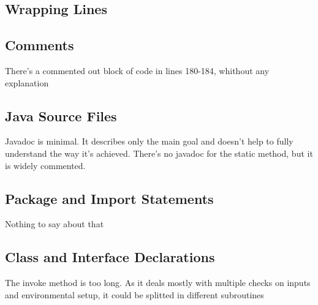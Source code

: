 \documentclass{article}
\begin{document}
\subsection{Wrapping Lines}

\subsection{Comments}
There's a commented out block of code in lines 180-184, whithout any explanation

\subsection{Java Source Files}
Javadoc is minimal. It describes only the main goal and doesn't help to fully understand the way it's achieved. There's no javadoc for the static method, but it is widely commented.

\subsection{Package and Import Statements}
Nothing to say about that

\subsection{Class and Interface Declarations}
The invoke method is too long. As it deals mostly with multiple checks on inputs and environmental setup, it could be splitted in different subroutines
\end{document}
